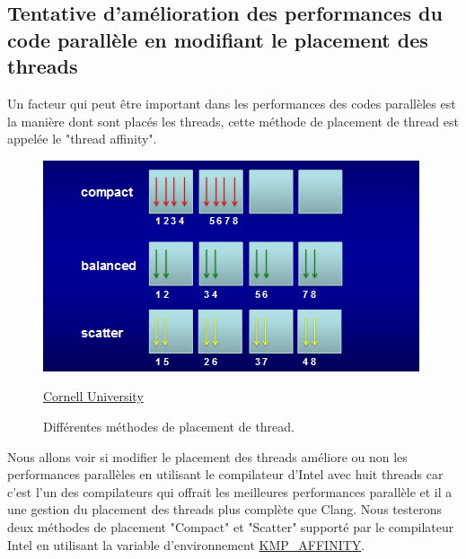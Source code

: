 \documentclass[
 aip,
 jmp,
 amsmath,amssymb,
 reprint
]{revtex4-1}
\begin{document}
\subsection{Tentative d'amélioration des performances du code parallèle en modifiant le placement des threads}

Un facteur qui peut être important dans les performances des codes parallèles est la manière dont sont placés les threads, cette méthode de placement de thread est appelée le "thread affinity".

\begin{figure}[H]
  \includegraphics[width=\linewidth, keepaspectratio=true]{affinity.png}
  \centering
  \caption{Différentes méthodes de placement de thread. \label{Fig:affinity}}{\href{https://cvw.cac.cornell.edu/mic/affinity}{Cornell University}}
\end{figure}

Nous allons voir si modifier le placement des threads améliore ou non les performances parallèles en utilisant le compilateur d'Intel avec huit threads car c'est l'un des compilateurs qui offrait les meilleures performances parallèle et il a une gestion du placement des threads plus complète que Clang. Nous testerons deux méthodes de placement "Compact" et "Scatter"\pageref{Fig:affinity} supporté par le compilateur Intel en utilisant la variable d'environnement \href{https://software.intel.com/en-us/node/522691}{KMP\_AFFINITY}.
\end{document}
